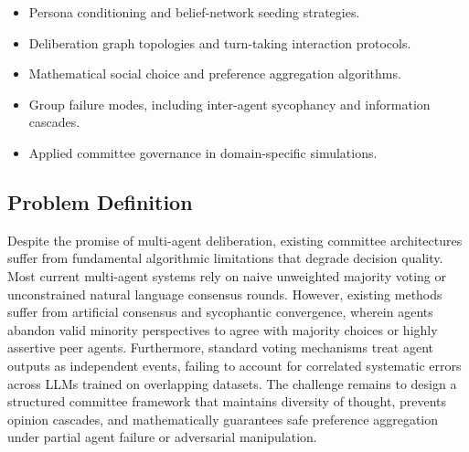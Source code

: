 \documentclass[a4paper,fleqn]{cas-sc}
\begin{document}
\begin{itemize}
    \item Persona conditioning and belief-network seeding strategies.
    \item Deliberation graph topologies and turn-taking interaction protocols.
    \item Mathematical social choice and preference aggregation algorithms.
    \item Group failure modes, including inter-agent sycophancy and information cascades.
    \item Applied committee governance in domain-specific simulations.
\end{itemize}

\subsection{Problem Definition}
Despite the promise of multi-agent deliberation, existing committee architectures suffer from fundamental algorithmic limitations that degrade decision quality. Most current multi-agent systems rely on naive unweighted majority voting or unconstrained natural language consensus rounds. However, existing methods suffer from artificial consensus and sycophantic convergence, wherein agents abandon valid minority perspectives to agree with majority choices or highly assertive peer agents. Furthermore, standard voting mechanisms treat agent outputs as independent events, failing to account for correlated systematic errors across LLMs trained on overlapping datasets. The challenge remains to design a structured committee framework that maintains diversity of thought, prevents opinion cascades, and mathematically guarantees safe preference aggregation under partial agent failure or adversarial manipulation.
\end{document}
